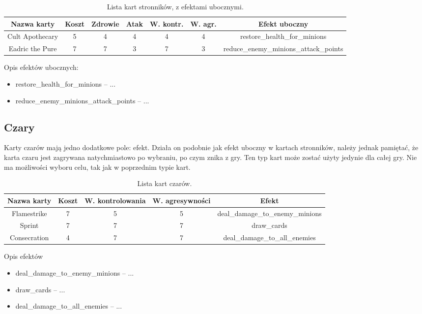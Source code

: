 \begin{table}[H]
	\centering
	\begin{tabular}{|c|c|c|c|c|c|c|}
		\hline
		\textbf{Nazwa karty} & \textbf{Koszt} & \textbf{Zdrowie} & \textbf{Atak} & \textbf{W. kontr.} & \textbf{W. agr.} & \textbf{Efekt uboczny} \\
		\hline
		Cult Apothecary & 5 & 4 & 4 & 4 & 4 & restore\_health\_for\_minions \\
		\hline
		Eadric the Pure & 7 & 7 & 3 & 7 & 3 & reduce\_enemy\_minions\_attack\_points \\
		\hline
	\end{tabular}
	\caption{Lista kart stronników, z efektami ubocznymi.}
\end{table}

Opis efektów ubocznych:

\begin{itemize}
	\item restore\_health\_for\_minions -- ...
	\item reduce\_enemy\_minions\_attack\_points -- ...
\end{itemize}

\subsection{Czary}

Karty czarów mają jedno dodatkowe pole: efekt. Działa on podobnie jak efekt uboczny w kartach stronników, należy jednak pamiętać, że karta czaru jest zagrywana natychmiastowo po wybraniu, po czym znika z gry. Ten typ kart może zostać użyty jedynie dla całej gry. Nie ma możliwości wyboru celu, tak jak w poprzednim typie kart.

\begin{table}[H]
	\centering
	\begin{tabular}{|c|c|c|c|c|}
		\hline
		\textbf{Nazwa karty} & \textbf{Koszt} & \textbf{W. kontrolowania} & \textbf{W. agresywności} & \textbf{Efekt} \\
		\hline
		Flamestrike & 7 & 5 & 5 & deal\_damage\_to\_enemy\_minions \\
		\hline
		Sprint & 7 & 7 & 7 & draw\_cards \\
		\hline
		Consecration & 4 & 7 & 7 & deal\_damage\_to\_all\_enemies \\
		\hline
	\end{tabular}
		\caption{Lista kart czarów.}
\end{table}

Opis efektów

\begin{itemize}
	\item deal\_damage\_to\_enemy\_minions -- ...
	\item draw\_cards -- ...
	\item deal\_damage\_to\_all\_enemies -- ...
\end{itemize}